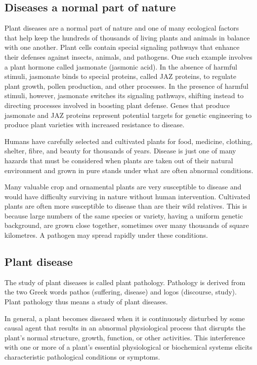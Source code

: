 \documentclass[a4paper,12pt]{article}
\begin{document}
\subsection{Diseases a normal part of nature}
Plant diseases are a normal part of nature and one of many ecological factors that help keep the hundreds of thousands of living plants and animals in balance with one another. Plant cells contain special signaling pathways that enhance their defenses against insects, animals, and pathogens. One such example involves a plant hormone called jasmonate (jasmonic acid). In the absence of harmful stimuli, jasmonate binds to special proteins, called JAZ proteins, to regulate plant growth, pollen production, and other processes. In the presence of harmful stimuli, however, jasmonate switches its signaling pathways, shifting instead to directing processes involved in boosting plant defense. Genes that produce jasmonate and JAZ proteins represent potential targets for genetic engineering to produce plant varieties with increased resistance to disease.
 
Humans have carefully selected and cultivated plants for food, medicine, clothing, shelter, fibre, and beauty for thousands of years. Disease is just one of many hazards that must be considered when plants are taken out of their natural environment and grown in pure stands under what are often abnormal conditions.

Many valuable crop and ornamental plants are very susceptible to disease and would have difficulty surviving in nature without human intervention. Cultivated plants are often more susceptible to disease than are their wild relatives. This is because large numbers of the same species or variety, having a uniform genetic background, are grown close together, sometimes over many thousands of square kilometres. A pathogen may spread rapidly under these conditions.

\subsection{Plant disease}

The study of plant diseases is called plant pathology. Pathology is derived from the two Greek words pathos (suffering, disease) and logos (discourse, study). Plant pathology thus means a study of plant diseases.

In general, a plant becomes diseased when it is continuously disturbed by some causal agent that results in an abnormal physiological process that disrupts the plant’s normal structure, growth, function, or other activities. This interference with one or more of a plant’s essential physiological or biochemical systems elicits characteristic pathological conditions or symptoms.
\end{document}
